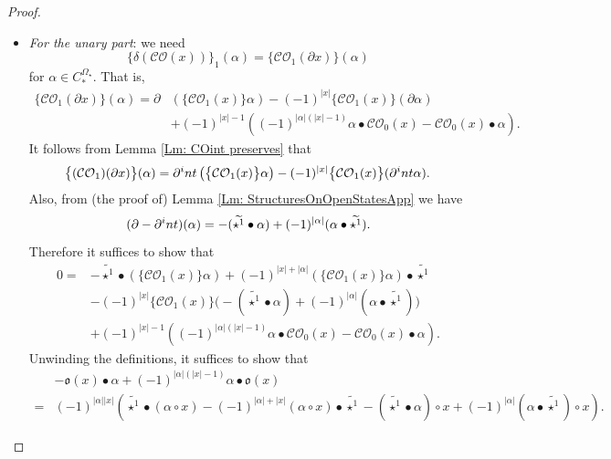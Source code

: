 \documentclass[10pt,a4paper]{amsart}
\newcommand{\CBa}{C_*^{\Omega_\star}}
\newcommand{\CO}{\mathcal{CO}}
\newcommand{\wt}[1]{\widetilde{#1}}
\begin{document}
\begin{proof}
\begin{itemize}
	\item	\emph{For the unary part}: we need \[\big\{\delta(\CO(x))\big\}_1(\alpha) = \big\{\CO_1(\partial x)\big\}(\alpha)\] for $\alpha\in \CBa$.
	That is, 
	\begin{align*}
		  \big\{ \CO_1(\partial x)\big\} (\alpha)= \partial &\left( \big\{ \CO_1(x)\big\} \alpha \right) - (-1)^{|x|} \big\{ \CO_1(x)\big\} (\partial \alpha) \\ 
		  &+ (-1)^{|x|-1} \left( (-1)^{|\alpha|(|x|-1)} \alpha\bullet \CO_0(x) - \CO_0(x)\bullet \alpha \right) .
	\end{align*}	
	It follows from Lemma \ref{Lm: COint preserves} that 
	\begin{align*}
		\big\{(\CO_1)(\partial x)\big\}(\alpha) = \partial^\textup{int} \left( \big\{\CO_1(x)\big\}\alpha\right)  -(-1)^{|x|} \big\{ \CO_1(x)\big\}(\partial^\textup{int} \alpha).
	\end{align*}
	Also, from (the proof of) Lemma \ref{Lm: StructuresOnOpenStatesApp} we have \[ (\partial - \partial^\textup{int})(\alpha) = - (\wt{\star^1}\bullet \alpha) + (-1)^{|\alpha|}(\alpha \bullet \wt{\star^1}). \] 	Therefore it suffices to show that 
	\begin{align*}
		0= &-\wt{\star^1}  \bullet \left( \big\{ \CO_1(x) \big\}\alpha \right) + (-1)^{|x|+|\alpha|} \left( \big\{ \CO_1(x) \big\}\alpha \right) \bullet  \wt{\star^1}\\
		&- (-1)^{|x|} \big\{ \CO_1(x)\big\} \big(-(\wt{\star^1}\bullet \alpha ) + (-1)^{|\alpha|} (\alpha\bullet \wt{\star^1})\big)\\
		& + (-1)^{|x|-1} \left( (-1)^{|\alpha|(|x|-1)} \alpha\bullet \CO_0(x) - \CO_0(x)\bullet \alpha \right).
	\end{align*}
	Unwinding the definitions, it suffices to show that 
	\begin{align*}
		&-\mathfrak{o}(x)\bullet \alpha + (-1)^{|\alpha|(|x|-1)} \alpha\bullet \mathfrak{o}(x) \\
		=& (-1)^{|\alpha||x|}\left( \wt{\star^1}\bullet (\alpha \circ x) -  (-1)^{|\alpha|+|x|}(\alpha\circ x) \bullet \wt{\star^1} - (\wt{\star^1}\bullet\alpha)\circ x+(-1)^{|\alpha|} (\alpha\bullet \wt{\star^1})\circ x\right).
	\end{align*}


\end{itemize}
\end{proof}
\end{document}
